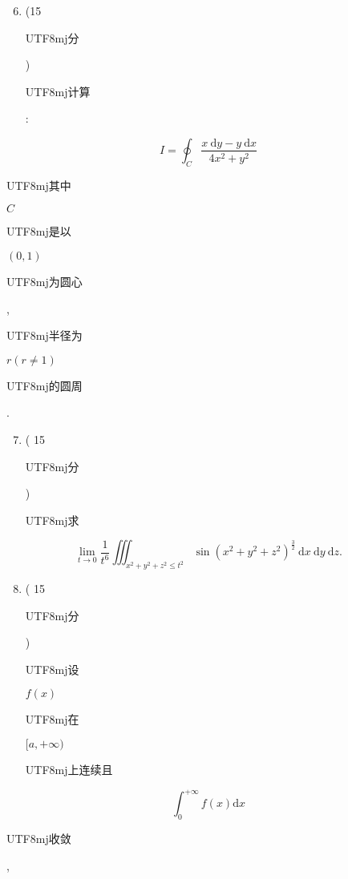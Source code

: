 \documentclass[10pt]{article}
\begin{document}
\begin{enumerate}
  \setcounter{enumi}{5}
  \item (15 \begin{CJK}{UTF8}{mj}分\end{CJK}) \begin{CJK}{UTF8}{mj}计算\end{CJK}:
\end{enumerate}
$$
I=\oint_{C} \frac{x \mathrm{~d} y-y \mathrm{~d} x}{4 x^{2}+y^{2}}
$$
\begin{CJK}{UTF8}{mj}其中\end{CJK} $C$ \begin{CJK}{UTF8}{mj}是以\end{CJK} $(0,1)$ \begin{CJK}{UTF8}{mj}为圆心\end{CJK}, \begin{CJK}{UTF8}{mj}半径为\end{CJK} $r(r \neq 1)$ \begin{CJK}{UTF8}{mj}的圆周\end{CJK}.

\begin{enumerate}
  \setcounter{enumi}{6}
  \item ( 15 \begin{CJK}{UTF8}{mj}分\end{CJK}) \begin{CJK}{UTF8}{mj}求\end{CJK}
\end{enumerate}
$$
\lim _{t \rightarrow 0} \frac{1}{t^{6}} \iiint_{x^{2}+y^{2}+z^{2} \leq t^{2}} \sin \left(x^{2}+y^{2}+z^{2}\right)^{\frac{3}{2}} \mathrm{~d} x \mathrm{~d} y \mathrm{~d} z .
$$

\begin{enumerate}
  \setcounter{enumi}{7}
  \item ( 15 \begin{CJK}{UTF8}{mj}分\end{CJK}) \begin{CJK}{UTF8}{mj}设\end{CJK} $f(x)$ \begin{CJK}{UTF8}{mj}在\end{CJK} $[a,+\infty)$ \begin{CJK}{UTF8}{mj}上连续且\end{CJK}
\end{enumerate}
$$
\int_{0}^{+\infty} f(x) \mathrm{d} x
$$
\begin{CJK}{UTF8}{mj}收敛\end{CJK},
\end{document}
